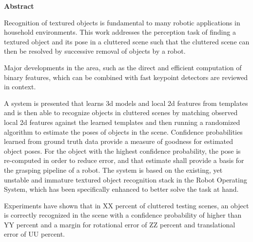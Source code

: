 

\clearemptydoublepage
{}
{}	

\vspace*{2cm}
\begin{center}
{\Large \bf Abstract}
\end{center}
\vspace{1cm}

Recognition of textured objects is fundamental to many robotic applications in
household environments. This work addresses the perception task of finding a
textured object and its pose in a cluttered scene such that the cluttered scene
can then be resolved by successive removal of objects by a robot.

Major developments in the area, such as the direct and efficient computation of
binary features, which can be combined with fast keypoint detectors are
reviewed in context.

A system is presented that learns 3d models and local 2d features from
templates and is then able to recognize objects in cluttered scenes by matching
observed local 2d features against the learned templates and then running a
randomized algorithm to estimate the poses of objects in the scene. Confidence
probabilities learned from ground truth data provide a measure of goodness for
estimated object poses. For the object with the highest confidence probability,
the pose is re-computed in order to reduce error, and that estimate shall
provide a basis for the grasping pipeline of a robot. The system is based on
the existing, yet unstable and immature textured object recognition stack in
the Robot Operating System, which has been specifically enhanced to better
solve the task at hand.

Experiments have shown that in XX percent of cluttered testing scenes, an
object is correctly recognized in the scene with a confidence probability of
higher than YY percent and a margin for rotational error of ZZ percent and
translational error of UU percent.

